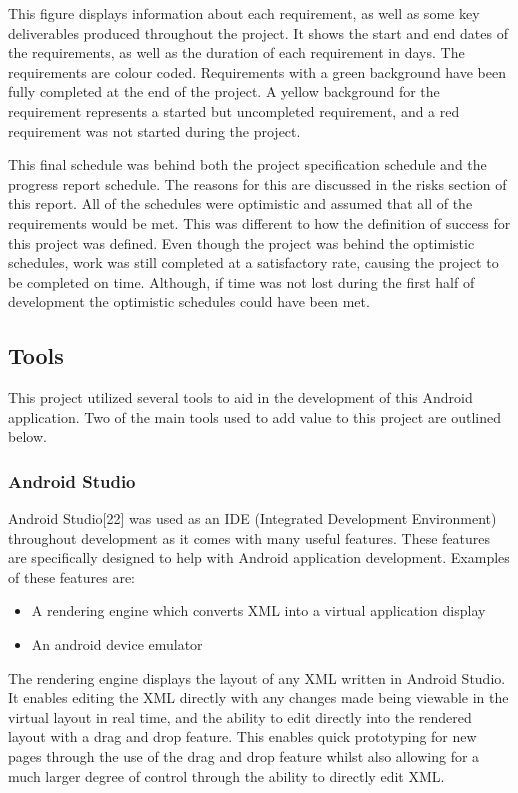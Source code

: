 \documentclass{article}
\begin{document}
This figure displays information about each requirement, as well as some key deliverables produced throughout the project. It shows the start and end dates of the requirements, as well as the duration of each requirement in days. The requirements are colour coded. Requirements with a green background have been fully completed at the end of the project. A yellow background for the requirement represents a started but uncompleted requirement, and a red requirement was not started during the project. \par

This final schedule was behind both the project specification schedule and the progress report schedule. The reasons for this are discussed in the risks section of this report. All of the schedules were optimistic and assumed that all of the requirements would be met. This was different to how the definition of success for this project was defined. Even though the project was behind the optimistic schedules, work was still completed at a satisfactory rate, causing the project to be completed on time. Although, if time was not lost during the first half of development the optimistic schedules could have been met. \par

\subsection{Tools}

This project utilized several tools to aid in the development of this Android application. Two of the main tools used to add value to this project are outlined below.

\subsubsection{Android Studio}

Android Studio[22] was used as an IDE (Integrated Development Environment) throughout development as it comes with many useful features. These features are specifically designed to help with Android application development. Examples of these features are: 

\begin{itemize}
	\item A rendering engine which converts XML into a virtual application display
	\item An android device emulator
\end{itemize}

The rendering engine displays the layout of any XML written in Android Studio. It enables editing the XML directly with any changes made being viewable in the virtual layout in real time, and the ability to edit directly into the rendered layout with a drag and drop feature. This enables quick prototyping for new pages through the use of the drag and drop feature whilst also allowing for a much larger degree of control through the ability to directly edit XML. \par
\end{document}
